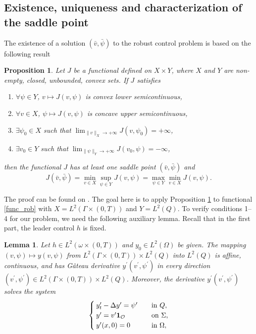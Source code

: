 \documentclass[preprint,10pt]{article}
\newtheorem{lemma}[theorem]{Lemma}
\newtheorem{proposition}[theorem]{Proposition}
\numberwithin{equation}{section}
\numberwithin{theorem}{section}
\begin{document}
{\subsection{Existence, uniqueness and characterization of the saddle point}

The existence of a solution $(\bar v,\bar \psi)$ to the robust control problem is based on the following result
%
\begin{proposition}\label{prop_saddle}
Let $J$ be a functional defined on $X\times Y$, where $X$ and $Y$ are non-empty, closed, unbounded, convex sets. If $J$ satisfies
%
\begin{enumerate}
\item $\forall \psi\in Y$, $v\mapsto J(v,\psi)$ is convex lower semicontinuous,
\item $\forall v\in X$, $\psi\mapsto J(v,\psi)$ is concave upper semicontinuous,
\item $\exists \psi_0\in X$ such that $\lim_{\|v\|_{X}\to+\infty}J(v,\psi_0)=+\infty$, 
\item $\exists v_0\in Y$ such that $\lim_{\|\psi\|_Y\to+\infty}J(v_0,\psi)=-\infty$,
\end{enumerate}
%
then the functional $J$ has at least one saddle point $(\bar v,\bar \psi)$ and
%
\begin{equation}
J(\bar v,\bar \psi)=\min_{v\in X}\sup_{\psi\in Y} J(v,\psi)=\max_{\psi\in Y}\min_{v\in X}J(v,\psi).
\end{equation}
%
\end{proposition}

 The proof can be found on \cite[Prop. 2.2, p. 173]{Ekeland}. The goal here is to apply Proposition \ref{prop_saddle} to functional \eqref{func_rob} with $X=L^2(\Gamma\times(0,T))$ and $Y=L^2(Q)$. To verify conditions 1--4 for our problem, we need the following auxiliary lemma. Recall that in the first part, the leader control $h$ is fixed.
%
\begin{lemma}\label{lemma_prop_sol1}
Let $h\in L^2(\omega\times(0,T))$ and $y_0\in L^2(\Omega)$ be given. The mapping $(v,\psi)\mapsto y(v,\psi)$ from $L^2(\Gamma\times(0,T))\times L^2(Q)$ into $L^2(Q)$ is affine, continuous, and has G\^{a}teau derivative $y^\prime(v^\prime,\psi^\prime)$ in every direction $(v^\prime,\psi^\prime)\in L^2(\Gamma\times(0,T))\times L^2(Q)$. Moreover, the derivative $y^\prime(v^\prime,\psi^\prime)$ solves the system
%
\begin{equation}\label{deriv_sys1}
\begin{cases}
y^\prime_t-\Delta y^\prime=\psi^\prime \quad &\textnormal{in $Q$}, \\
y^\prime=v^\prime\mathbf{1}_{\mathcal O} \quad &\textnormal{on $\Sigma$,} \\
y^\prime(x,0)=0 \quad &\textnormal{in $\Omega$},
\end{cases}
\end{equation}
%
\end{lemma}

}
\end{document}
